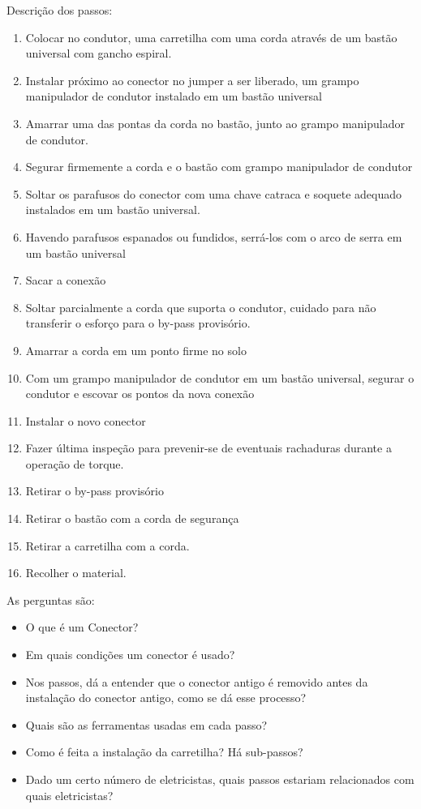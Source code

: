 Descrição dos passos:

\begin{enumerate}
	\item Colocar no condutor, uma carretilha com uma corda através de um bastão universal com gancho espiral.
	\item Instalar próximo ao conector no jumper a ser liberado, um grampo manipulador de condutor instalado em um bastão universal
	\item Amarrar uma das pontas da corda no bastão, junto ao grampo manipulador de condutor.
	\item Segurar firmemente a corda e o bastão com grampo manipulador de condutor
	\item Soltar os parafusos do conector com uma chave catraca e soquete adequado instalados em um bastão universal.
	\item Havendo parafusos espanados ou fundidos, serrá-los com o arco de serra em um bastão universal
	\item Sacar a conexão
	\item Soltar parcialmente a corda que suporta o condutor, cuidado para não transferir o esforço para o by-pass provisório.
	\item Amarrar a corda em um ponto firme no solo
	\item Com um grampo manipulador de condutor em um bastão universal, segurar o condutor e escovar os pontos da nova conexão
	\item Instalar o novo conector
	\item Fazer última inspeção para prevenir-se de eventuais rachaduras durante a operação de torque.
	\item Retirar o by-pass provisório
	\item Retirar o bastão com a corda de segurança
	\item Retirar a carretilha com a corda.
	\item Recolher o material.
\end{enumerate}

As perguntas são:
\begin{itemize}
    \item O que é um Conector?
    \item Em quais condições um conector é usado?
    \item Nos passos, dá a entender que o conector antigo é removido antes da instalação do conector antigo, como se dá esse processo?
    \item Quais são as ferramentas usadas em cada passo?
    \item Como é feita a instalação da carretilha? Há sub-passos?
    \item Dado um certo número de eletricistas, quais passos estariam relacionados com quais eletricistas?
\end{itemize}

